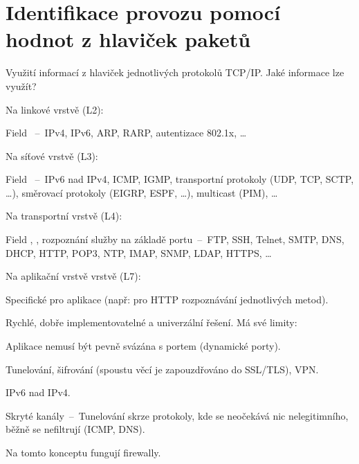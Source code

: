 
\section{Identifikace provozu pomocí hodnot z hlaviček paketů}

\begin{compactitem}
    \item Využití informací z hlaviček jednotlivých protokolů TCP/IP. Jaké informace lze využít? \begin{compactitem}
        \item Na linkové vrstvě (L2): \begin{compactitem}
            \item Field ~--~IPv4, IPv6, ARP, RARP, autentizace 802.1x, \dots
        \end{compactitem}
        \item Na síťové vrstvě (L3): \begin{compactitem}
            \item Field ~--~IPv6 nad IPv4, ICMP, IGMP, transportní protokoly (UDP, TCP, SCTP, \dots), směrovací protokoly (EIGRP, ESPF, \dots), multicast (PIM), \dots
        \end{compactitem}
        \item  Na transportní vrstvě (L4): \begin{compactitem}
            \item Field , , rozpoznání služby na základě portu~--~FTP, SSH, Telnet, SMTP, DNS, DHCP, HTTP, POP3, NTP, IMAP, SNMP, LDAP, HTTPS, \dots
        \end{compactitem}
        \item  Na aplikační vrstvě vrstvě (L7): \begin{compactitem}
            \item Specifické pro aplikace (např: pro HTTP rozpoznávání jednotlivých metod).
        \end{compactitem}
    \end{compactitem}
    \item Rychlé, dobře implementovatelné a univerzální řešení. Má své limity: \begin{compactitem}
        \item Aplikace nemusí být pevně svázána s portem (dynamické porty).
        \item Tunelování, šifrování (spoustu věcí je zapouzdřováno do SSL/TLS), VPN.
        \item IPv6 nad IPv4.
        \item Skryté kanály~--~Tunelování skrze protokoly, kde se neočekává nic nelegitimního, běžně se nefiltrují (ICMP, DNS).
    \end{compactitem}
    \item Na tomto konceptu fungují firewally.
\end{compactitem}

